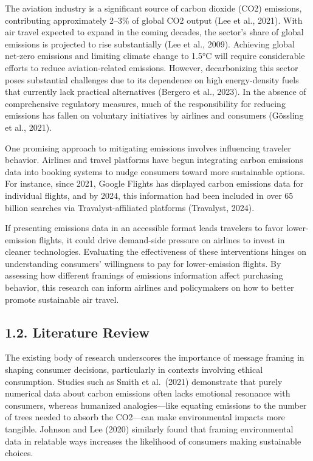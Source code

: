 \documentclass[
]{article}
\begin{document}
The aviation industry is a significant source of carbon dioxide (CO2)
emissions, contributing approximately 2--3\% of global CO2 output (Lee
et al., 2021). With air travel expected to expand in the coming decades,
the sector's share of global emissions is projected to rise
substantially (Lee et al., 2009). Achieving global net-zero emissions
and limiting climate change to 1.5°C will require considerable efforts
to reduce aviation-related emissions. However, decarbonizing this sector
poses substantial challenges due to its dependence on high
energy-density fuels that currently lack practical alternatives (Bergero
et al., 2023). In the absence of comprehensive regulatory measures, much
of the responsibility for reducing emissions has fallen on voluntary
initiatives by airlines and consumers (Gössling et al., 2021).

One promising approach to mitigating emissions involves influencing
traveler behavior. Airlines and travel platforms have begun integrating
carbon emissions data into booking systems to nudge consumers toward
more sustainable options. For instance, since 2021, Google Flights has
displayed carbon emissions data for individual flights, and by 2024,
this information had been included in over 65 billion searches via
Travalyst-affiliated platforms (Travalyst, 2024).

If presenting emissions data in an accessible format leads travelers to
favor lower-emission flights, it could drive demand-side pressure on
airlines to invest in cleaner technologies. Evaluating the effectiveness
of these interventions hinges on understanding consumers' willingness to
pay for lower-emission flights. By assessing how different framings of
emissions information affect purchasing behavior, this research can
inform airlines and policymakers on how to better promote sustainable
air travel.

\hypertarget{literature-review}{%
\subsection{1.2. Literature Review}\label{literature-review}}

The existing body of research underscores the importance of message
framing in shaping consumer decisions, particularly in contexts
involving ethical consumption. Studies such as Smith et al.~(2021)
demonstrate that purely numerical data about carbon emissions often
lacks emotional resonance with consumers, whereas humanized
analogies---like equating emissions to the number of trees needed to
absorb the CO2---can make environmental impacts more tangible. Johnson
and Lee (2020) similarly found that framing environmental data in
relatable ways increases the likelihood of consumers making sustainable
choices.
\end{document}
